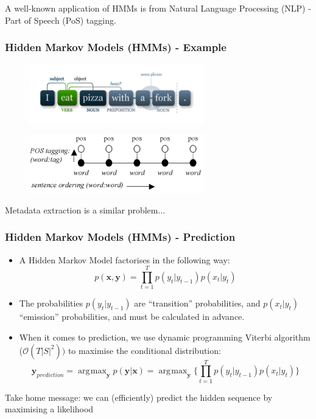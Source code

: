 \documentclass{beamer}
\DeclareMathOperator*{\argmax}{\arg\!\max}
\begin{document}
\begin{frame}
A well-known application of HMMs is from Natural Language Processing (NLP) - Part of Speech (PoS) tagging.
\frametitle{Hidden Markov Models (HMMs) - Example}
\begin{figure}[!ht]
\center
\includegraphics[width=3in]{figures/pos1.pdf}
\end{figure}

\begin{figure}[!ht]
\center
\includegraphics[width=3in]{figures/pos2.png}
\end{figure}
Metadata extraction is a similar problem...
\end{frame}


\begin{frame}
\frametitle{Hidden Markov Models (HMMs) - Prediction}
\begin{itemize}
\item A Hidden Markov Model factorises in the following way:
$$p(\mathbf{x}, \mathbf{y}) = \prod_{t=1}^T p(y_t | y_{t-1})p(x_t | y_t)$$
\item The probabilities $p(y_t | y_{t-1})$ are ``transition'' probabilities, and $p(x_t | y_t) $``emission'' probabilities, and must be calculated in advance.
\item When it comes to prediction, we use dynamic programming Viterbi algorithm ($\mathcal{O}(T|S|^2))$ to maximise the conditional distribution:
$$\textbf{y}_{prediction} = \argmax_{\textbf{y}} p(\textbf{y} | \textbf{x}) = \argmax_{\textbf{y}}\Bigg\{\prod_{t=1}^T p(y_t | y_{t-1})p(x_t | y_t)\Bigg\}$$
\end{itemize}
Take home message: we can (efficiently) predict the hidden sequence by maximising a likelihood
\end{frame}

\end{document}
